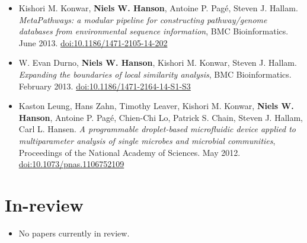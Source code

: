 \documentclass[print]{hanson_cv} %
\begin{document}
\begin{itemize}
\item
  Kishori M. Konwar, \textbf{Niels W. Hanson}, Antoine P. Pag\'{e}, Steven
  J. Hallam. \emph{MetaPathways: a modular pipeline for constructing
  pathway/genome databases from environmental sequence information}, BMC
  Bioinformatics. June 2013. \href{http://dx.doi.org/10.1186/1471-2105-14-202}{doi:10.1186/1471-2105-14-202}
\item
  W. Evan Durno, \textbf{Niels W. Hanson}, Kishori M. Konwar, Steven J.
  Hallam. \emph{Expanding the boundaries of local similarity analysis}, BMC Bioinformatics.
  February 2013. \href{http://dx.doi.org/10.1186/1471-2164-14-S1-S3}{doi:10.1186/1471-2164-14-S1-S3}
\item
  Kaston Leung, Hans Zahn, Timothy Leaver, Kishori M. Konwar,
  \textbf{Niels W. Hanson}, Antoine P. Pag\'{e}, Chien-Chi Lo, Patrick S.
  Chain, Steven J. Hallam, Carl L. Hansen. \emph{A programmable
  droplet-based microfluidic device applied to multiparameter analysis
  of single microbes and microbial communities}, Proceedings of the
  National Academy of Sciences. May 2012.
  \href{http://dx.doi.org/10.1073/pnas.1106752109}{doi:10.1073/pnas.1106752109}
\end{itemize}

\section{In-review}
\begin{itemize}
\item No papers currently in review.
\end{itemize}
\end{document}
